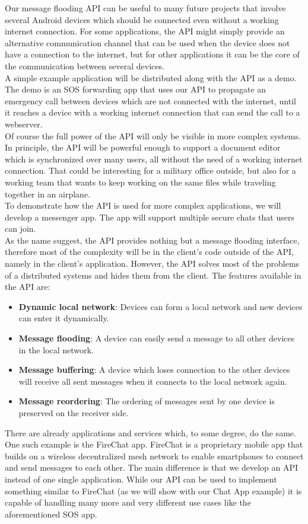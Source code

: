 Our message flooding API can be useful to many future projects that involve several Android devices which should be connected even without a working internet connection. For some applications, the API might simply provide an alternative communication channel that can be used when the device does not have a connection to the internet, but for other applications it can be the core of the communication between several devices. \\
A simple example application will be distributed along with the API as a demo. The demo is an SOS forwarding app that uses our API to propagate an emergency call between devices which are not connected with the internet, until it reaches a device with a working internet connection that can send the call to a webserver. \\
Of course the full power of the API will only be visible in more complex systems. In principle, the API will be powerful enough to support a document editor which is synchronized over many users, all without the need of a working internet connection. That could be interesting for a military office outside, but also for a working team that wants to keep working on the same files while traveling together in an airplane.\\
To demonstrate how the API is used for more complex applications, we will develop a messenger app. The app will support multiple secure chats that users can join. \\
As the name suggest, the API provides nothing but a message flooding interface, therefore most of the complexity will be in the client's code outside of the API, namely in the client's application. However, the API solves most of the problems of a distributed systems and hides them from the client. The features available in the API are:
\begin{itemize}
	\item {\bf Dynamic local network}: Devices can form a local network and new devices can enter it dynamically.
	\item {\bf Message flooding}: A device can easily send a message to all other devices in the local network.
	\item {\bf Message buffering}: A device which loses connection to the other devices will receive all sent messages when it connects to the local network again.
	\item {\bf Message reordering}: The ordering of messages sent by one device is preserved on the receiver side.
\end{itemize}
There are already applications and services which, to some degree,  do the same. One such example is the FireChat app. FireChat is a proprietary mobile app that builds on a wireless decentralized mesh network to enable smartphones to connect and send messages to each other. The main difference is that we develop an API instead of one single application. While our API can be used to implement something similar to FireChat (as we will show with our Chat App example) it is capable of handling many more and very different use cases like the aforementioned SOS app.
